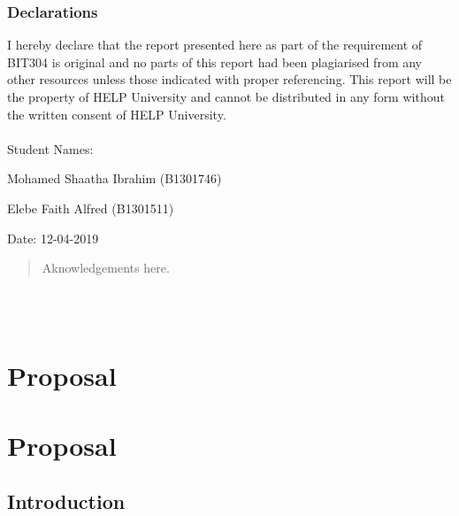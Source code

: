 \documentclass[12pt,a4paper,man]{report}
\begin{document}
\newpage
{}
\vspace*{\fill}
\section*{Declarations}
I hereby declare that the report presented here as part of the requirement of BIT304 is original and no parts of this report had been plagiarised from any other resources unless those indicated with proper referencing.  This report will be the property of HELP University and cannot be distributed in any form without the written consent of HELP University.
\\\\Student Names:
\begin{description}
 \item Mohamed Shaatha Ibrahim (B1301746)
 \item Elebe Faith Alfred (B1301511)
\end{description}
Date: 12-04-2019
\vspace*{\fill}

\renewcommand{\abstractname}{Acknowledgement}
\begin{abstract}
	Aknowledgements here.
\end{abstract}



\newcommand\SentenceCase[1]{
  \caselower[e]{#1}
  \capitalize[q]{\thestring}
}
\newcommand*\parttitle{}
\let\origpart\part
\renewcommand*{\part}[2][]{%
   \ifx\\#1\\%
      \origpart{#2}%
      \renewcommand*\parttitle{#2}%
   \else
      \origpart[#1]{#2}%
      \renewcommand*\parttitle{#1}%
   \fi
}

\pagestyle{fancy}
\fancyhf{}
\rhead{\thepage}
\lhead{\parttitle{}: \leftmark}
\cfoot{\thepage}
\renewcommand{\chaptermark}[1]{\markboth{#1}{}}

\part{Proposal}
\label{sec:org9eb8adb}
\chapter{Introduction}
\label{sec:orgf78f396}
\end{document}
